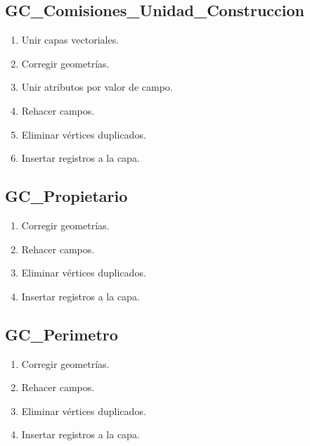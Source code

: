 \documentclass[letterpaper,10pt,spanish]{sphinxmanual}
\begin{document}
\subsection{GC\_Comisiones\_Unidad\_Construccion}
\label{\detokenize{ETL_SNC/Model:gc-comisiones-unidad-construccion}}\begin{enumerate}
%
\item {} 
Unir capas vectoriales.

\item {} 
Corregir geometrías.

\item {} 
Unir atributos por valor de campo.

\item {} 
Rehacer campos.

\item {} 
Eliminar vértices duplicados.

\item {} 
Insertar registros a la capa.


\end{enumerate}


\subsection{GC\_Propietario}
\label{\detokenize{ETL_SNC/Model:gc-propietario}}\begin{enumerate}
%
\item {} 
Corregir geometrías.

\item {} 
Rehacer campos.

\item {} 
Eliminar vértices duplicados.

\item {} 
Insertar registros a la capa.


\end{enumerate}


\subsection{GC\_Perimetro}
\label{\detokenize{ETL_SNC/Model:gc-perimetro}}\begin{enumerate}
%
\item {} 
Corregir geometrías.

\item {} 
Rehacer campos.

\item {} 
Eliminar vértices duplicados.

\item {} 
Insertar registros a la capa.


\end{enumerate}
\end{document}

